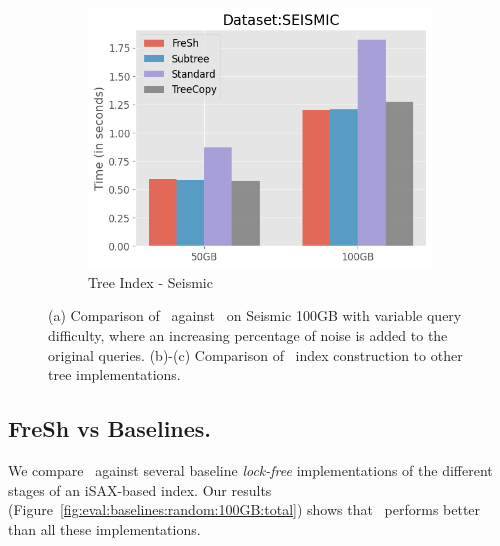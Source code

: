 \begin{figure}[htbp]
    \begin{subfigure}{0.48\textwidth}
        \includegraphics[width=\textwidth]{figures/Experiments/scale-dataset-tree-index-seismic.png}
        \caption{Tree Index - Seismic}
        \label{fig:eval:scale-dataset:tree-index:seismic}
    \end{subfigure}    

    \caption{(a) Comparison of \Fresh\ against \MESSI\ on Seismic 100GB with variable query difficulty, where an increasing percentage of noise is added to the original queries.
    (b)-(c) Comparison of \Fresh\ index construction to other tree implementations.}
    \label{fig:eval:scale-dataset:tree-index}
\end{figure}


\subsection{ FreSh vs Baselines.}
We compare \Fresh\ against several baseline {\em lock-free} implementations of the 
different stages of an iSAX-based index. 
Our results (Figure~\ref{fig:eval:baselines:random:100GB:total})
shows that \Fresh\ performs better than all these implementations.


